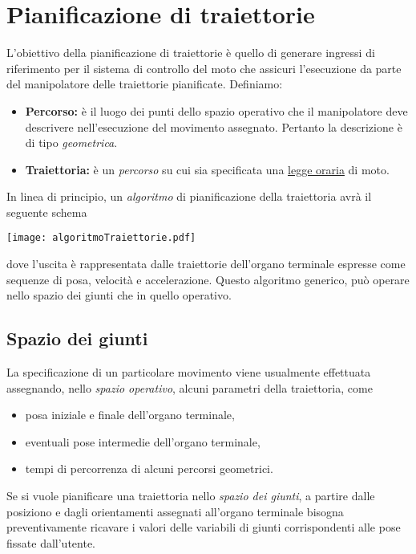 \chapter{Pianificazione di traiettorie}
L'obiettivo della pianificazione di traiettorie è quello di generare ingressi di riferimento per il sistema di controllo del moto che assicuri l'esecuzione da parte del manipolatore delle traiettorie pianificate. Definiamo:
\begin{itemize}
	\item \textbf{Percorso:} è il luogo dei punti dello spazio operativo che il manipolatore deve descrivere nell'esecuzione del movimento assegnato. Pertanto la descrizione è di tipo \emph{geometrica}.
	\item \textbf{Traiettoria:} è un \emph{percorso} su cui sia specificata una \underline{legge oraria} di moto.
\end{itemize}
In linea di principio, un \emph{algoritmo} di pianificazione della traiettoria avrà il seguente schema
\begin{center}
	\texttt{[image: algoritmoTraiettorie.pdf]}
\end{center}
dove l'uscita è rappresentata dalle traiettorie dell'organo terminale espresse come sequenze di posa, velocità e accelerazione. Questo algoritmo generico, può operare nello spazio dei giunti che in quello operativo.

\section{Spazio dei giunti}
La specificazione di un particolare movimento viene usualmente effettuata assegnando, nello \emph{spazio operativo}, alcuni parametri della traiettoria, come
\begin{itemize}
	\item posa iniziale e finale dell'organo terminale,
	\item eventuali pose intermedie dell'organo terminale,
	\item tempi di percorrenza di alcuni percorsi geometrici.
\end{itemize}
Se si vuole pianificare una traiettoria nello \emph{spazio dei giunti}, a partire dalle posiziono e dagli orientamenti assegnati all'organo terminale bisogna preventivamente ricavare i valori delle variabili di giunti corrispondenti alle pose fissate dall'utente.

